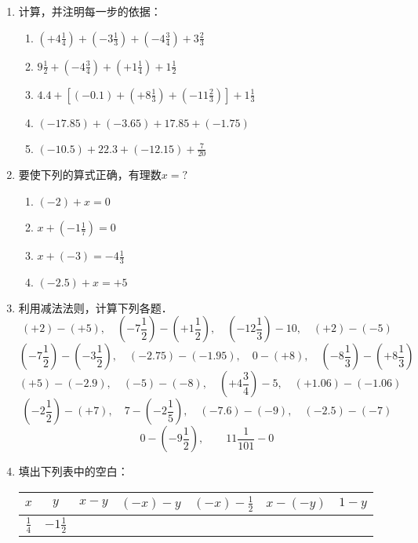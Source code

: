\begin{enumerate}
\item 计算，并注明每一步的依据：
\begin{enumerate}
    \item $\left(+4 \frac{1}{4}\right)+\left(-3 \frac{1}{3}\right)+\left(-4 \frac{3}{4}\right)+3 \frac{2}{3}$
    \item $9 \frac{1}{2}+\left(-4 \frac{3}{4}\right)+\left(+1 \frac{1}{4}\right)+1 \frac{1}{2}$
    \item $4.4+\left[(-0.1)+\left(+8\frac{1}{3}\right)+\left(-11\frac{2}{3}\right)\right]+1\frac{1}{3}$
    \item $(-17.85)+(-3.65)+17.85+(-1.75)$
    \item $(-10.5)+22.3+(-12.15)+\frac{7}{20}$
\end{enumerate}
\item 要使下列的算式正确，有理数$x=?$
\begin{multicols}{2}
\begin{enumerate}
    \item $(-2)+x=0$
    \item $x+\left(-1\frac{1}{7}\right)=0$
    \item $x+(-3)=-4\frac{1}{3}$
    \item $(-2.5)+x=+5$
\end{enumerate}
\end{multicols}
\item 利用减法法则，计算下列各题．
\[(+2)-(+5),\quad \left(-7\frac{1}{2}\right)-\left(+1\frac{1}{2}\right),\quad \left(-12\frac{1}{3}\right)-10,\quad (+2)-(-5)\]
\[\left(-7\frac{1}{2}\right)-\left(-3\frac{1}{2}\right),\quad (-2.75)-(-1.95),\quad 0-(+8),\quad \left(-8\frac{1}{3}\right)-\left(+8\frac{1}{3}\right)\]
\[(+5)-(-2.9), \quad (-5)-(-8),\quad \left(+4\frac{3}{4}\right)-5,\quad (+1.06)-(-1.06)\]
\[\left(-2\frac{1}{2}\right)-(+7),\quad 7-\left(-2\frac{1}{5}\right),\quad (-7.6)-(-9),\quad (-2.5)-(-7)\]
\[0-\left(-9\frac{1}{2}\right),\qquad 11\frac{1}{101}-0\]

\item 填出下列表中的空白：
\begin{center}
\begin{tabular}{c|c|c|c|c|c|c}
\hline
$x$  &  $y$  &  $x-y$  &  $(-x)-y$  &  $(-x)-\frac{1}{2}$  &  $x-(-y)$  &  $1-y$\\
\hline
$\frac{1}{4}$ & $-1\frac{1}{2}$ &&&&&\\
\hline
\end{tabular}    
\end{center}


\end{enumerate}
